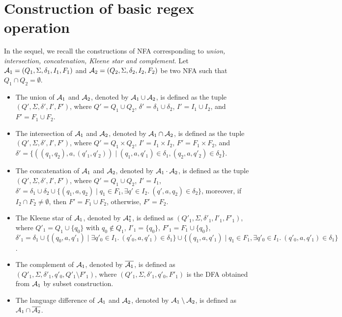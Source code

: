 \section{Construction of basic regex operation} \label{appendix:cefa}
In the sequel, we recall the constructions of NFA corresponding to \emph{union, intersection, concatenation, Kleene star and complement}. 
Let $\mathcal{A}_1 = (Q_1, \Sigma, \delta_1, I_1, F_1)$ and $\mathcal{A}_2 = (Q_2, \Sigma, \delta_2, I_2, F_2)$ be two NFA such that $Q_1 \cap Q_2 = \emptyset$. 
\begin{itemize}
\item The union of $\mathcal{A}_1$ and $\mathcal{A}_2$, denoted by $\mathcal{A}_1 \cup \mathcal{A}_2$, is defined as the tuple $(Q', \Sigma, \delta', I', F')$, where $Q'= Q_1 \cup Q_2$, $\delta' = \delta_1 \cup \delta_2$, $I' = I_1 \cup I_2$, and $F'=F_1 \cup F_2$. 
%
\item The intersection of $\mathcal{A}_1$ and $\mathcal{A}_2$, denoted by $\mathcal{A}_1 \cap \mathcal{A}_2$, is defined as the tuple $(Q', \Sigma, \delta', I', F')$, where $Q' = Q_1 \times Q_2$, $I' = I_1 \times I_2$, $F' = F_1 \times F_2$, and $\delta' = \{((q_1, q_2), a, (q'_1, q'_2)) \mid (q_1, a, q'_1) \in \delta_1, (q_2, a, q'_2) \in \delta_2\}$.
%
\item The concatenation of $\mathcal{A}_1$ and $\mathcal{A}_2$, denoted by $\mathcal{A}_1 \cdot \mathcal{A}_2$, is defined as the tuple $(Q', \Sigma, \delta', I', F')$, where $Q' = Q_1 \cup Q_2$, $I' = I_1$, $\delta' = \delta_1 \cup \delta_2 \cup \{(q_1, a, q_2) \mid q_1 \in F_1, \exists q' \in I_2.\ (q', a, q_2) \in \delta_2\}$, moreover, if $I_2 \cap F_2 \neq \emptyset$, then $F'= F_1 \cup F_2$, otherwise, $F'= F_2$.
%
\item The Kleene star of $\mathcal{A}_1$, denoted by $\mathcal{A}_1^*$, is defined as $(Q'_1, \Sigma, \delta'_1, I'_1, F'_1)$, where $Q'_1 = Q_1 \cup \{q_0\}$ with $q_0 \not \in Q_1$, $I'_1 = \{q_0\}$, $F'_1= F_1 \cup \{q_0\}$, $\delta'_1 = \delta_1 \cup \{(q_0, a, q'_1)  \mid \exists q'_0 \in I_1.\ (q'_0, a, q'_1) \in \delta_1\} \cup \{(q_1, a, q'_1) \mid q_1 \in F_1, \exists q'_0 \in I_1.\ (q'_0, a, q'_1) \in \delta_1\}$.
%
\item The complement of $\mathcal{A}_1$, denoted by $\overline{\mathcal{A}_1}$, is defined as $(Q'_1, \Sigma, \delta'_1, q'_0, Q'_1 \setminus F'_1)$, where  $(Q'_1, \Sigma, \delta'_1, q'_0, F'_1)$ is the DFA obtained from $\mathcal{A}_1$ by subset construction.  
%
\item The language difference of $\mathcal{A}_1$ and $\mathcal{A}_2$, denoted by $\mathcal{A}_1 \setminus \mathcal{A}_2$, is defined as $\mathcal{A}_1 \cap \overline{\mathcal{A}_2}$.
\end{itemize}


